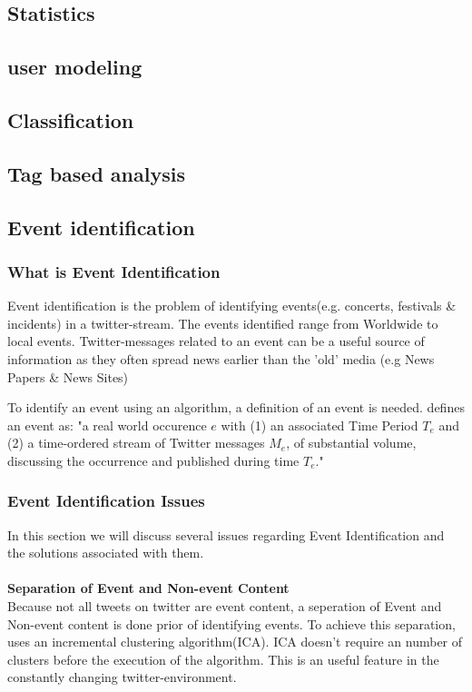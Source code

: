 \documentclass{article}
\begin{document}
\subsection{Statistics}
\subsection{user modeling}
\subsection{Classification}
\subsection{Tag based analysis}
\subsection{Event identification}
\subsubsection{What is Event Identification}
Event identification is the problem of identifying events(e.g. concerts, festivals \& incidents) in a twitter-stream. The events identified range from Worldwide to local events. Twitter-messages related to an event can be a useful source of information as they often spread news earlier than the 'old' media (e.g News Papers \& News Sites)

To identify an event using an algorithm, a definition of an event is needed. \cite{eventident} defines an event as: "a real world occurence $e$ with (1) an associated Time Period $T_e$ and (2) a time-ordered stream of Twitter messages $M_e$, of substantial volume, discussing the
occurrence and published during time $T_e$."

\subsubsection{Event Identification Issues}
In this section we will discuss several issues regarding Event Identification and the solutions associated with them.
\\\\ 
\textbf{Separation of Event and Non-event Content}\\
Because not all tweets on twitter are event content, a seperation of Event and Non-event content is done prior of identifying events. To achieve this separation, \cite{eventident} uses an incremental clustering algorithm(ICA). ICA doesn't require an number of clusters before the execution of the algorithm. This is an useful feature in the constantly changing twitter-environment.
\end{document}
